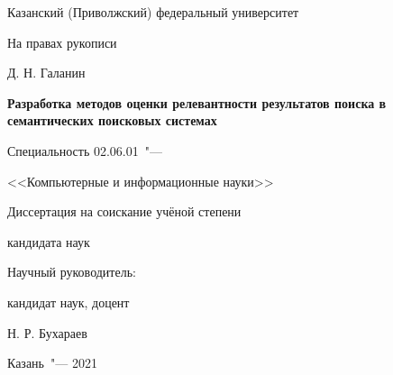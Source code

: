\thispagestyle{empty}
\begin{center}
    Казанский (Приволжский) федеральный университет
\end{center}
%
\vspace{0pt plus4fill} %
\begin{flushright}
    На правах рукописи

\end{flushright}
%
\vspace{0pt plus6fill} %
\begin{center}
    {\large Д. Н. Галанин}
\end{center}
%
\vspace{0pt plus1fill} %
\begin{center}
    \textbf {\large %
        Разработка методов оценки релевантности результатов поиска в семантических поисковых системах}

    \vspace{0pt plus2fill} %
    {%
        Специальность 02.06.01\ "---

        <<Компьютерные и информационные науки>>
    }

    \vspace{0pt plus2fill} %
    Диссертация на соискание учёной степени

    кандидата наук
\end{center}
%
\vspace{0pt plus4fill} %
\begin{flushright}

    Научный руководитель:

    кандидат наук, доцент

    Н. Р. Бухараев

\end{flushright}
%
\vspace{0pt plus4fill} %
{\centering Казань\ "--- 2021\par}
\newpage